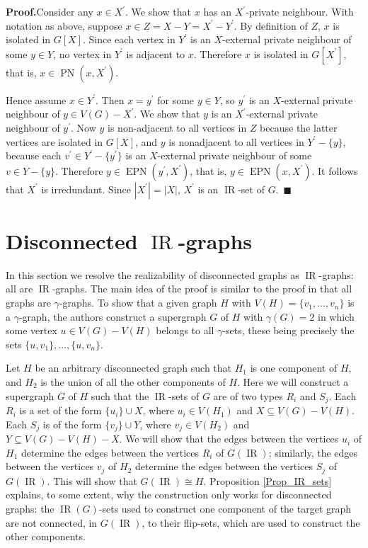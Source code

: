 \documentclass[12pt]{article}%
\begin{document}
\noindent\textbf{Proof.\hspace{0.1in}}Consider any $x\in X^{\prime}$. We show
that $x$ has an $X^{\prime}$-private neighbour. With notation as above,
suppose $x\in Z=X-Y=X^{\prime}-Y^{\prime}$. By definition of $Z$, $x$ is
isolated in $G[X]$. Since each vertex in $Y^{\prime}$ is an $X$-external
private neighbour of some $y\in Y$, no vertex in $Y^{\prime}$ is adjacent to
$x$. Therefore $x$ is isolated in $G[X^{\prime}]$, that is, $x\in
\operatorname{PN}(x,X^{\prime})$.

Hence assume $x\in Y^{\prime}$. Then $x=y^{\prime}$ for some $y\in Y$, so
$y^{\prime}$ is an $X$-external private neighbour of $y\in V(G)-X^{\prime}$.
We show that $y$ is an $X^{\prime}$-external private neighbour of $y^{\prime}%
$. Now $y$ is non-adjacent to all vertices in $Z$ because the latter vertices
are isolated in $G[X]$, and $y$ is nonadjacent to all vertices in $Y^{\prime
}-\{y\}$, because each $v^{\prime}\in Y^{\prime}-\{y^{\prime}\}$ is an
$X$-external private neighbour of some $v\in Y-\{y\}$. Therefore
$y\in\operatorname{EPN}(y^{\prime},X^{\prime})$, that is, $y\in
\operatorname{EPN}(x,X^{\prime})$. It follows that $X^{\prime}$ is
irredundant. Since $|X^{\prime}|=|X|$, $X^{\prime}$ is an $\operatorname{IR}%
$-set of $G$.~$\blacksquare$

\section{Disconnected $\operatorname{IR}$-graphs}

\label{Sec_Disc}In this section we resolve the realizability of disconnected
graphs as $\operatorname{IR}$-graphs: all are $\operatorname{IR}$-graphs. The
main idea of the proof is similar to the proof in \cite{CHH10} that all graphs
are $\gamma$-graphs. To show that a given graph $H$ with $V(H)=\{v_{1}%
,...,v_{n}\}$ is a $\gamma$-graph, the authors construct a supergraph $G$ of
$H$ with $\gamma(G)=2$ in which some vertex $u\in V(G)-V(H)$ belongs to all
$\gamma$-sets, these being precisely the sets $\{u,v_{1}\},...,\{u,v_{n}\}$.

Let $H$ be an arbitrary disconnected graph such that $H_{1}$ is one component
of $H$, and $H_{2}$ is the union of all the other components of $H$. Here we
will construct a supergraph $G$ of $H$ such that the $\operatorname{IR}$-sets
of $G$ are of two types $R_{i}$ and $S_{j}$. Each $R_{i}$ is a set of the form
$\{u_{i}\}\cup X$, where $u_{i}\in V(H_{1})$ and $X\subseteq V(G)-V(H)$. Each
$S_{j}$ is of the form $\{v_{j}\}\cup Y$, where $v_{j}\in V(H_{2})$ and
$Y\subseteq V(G)-V(H)-X$. We will show that the edges between the vertices
$u_{i}$ of $H_{1}$ determine the edges between the vertices $R_{i}$ of
$G(\operatorname{IR})$; similarly, the edges between the vertices $v_{j}$ of
$H_{2}$ determine the edges between the vertices $S_{j}$ of
$G(\operatorname{IR})$. This will show that $G(\operatorname{IR})\cong H$.
Proposition \ref{Prop_IR_sets} explains, to some extent, why the construction
only works for disconnected graphs: the $\operatorname{IR}(G)$-sets used to
construct one component of the target graph are not connected, in
$G(\operatorname{IR})$, to their flip-sets, which are used to construct the
other components.
\end{document}

